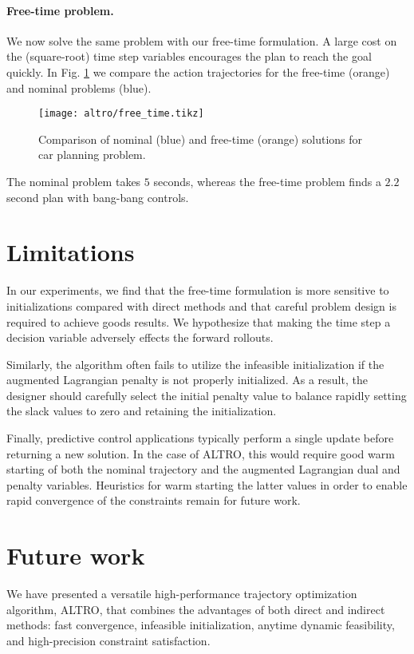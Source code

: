 \paragraph{Free-time problem.}
We now solve the same problem with our free-time formulation. A large cost on the (square-root) time step variables encourages the plan to reach the goal quickly. In Fig. \ref{altro_car_free_time} we compare the action trajectories for the free-time (orange) and nominal problems (blue). 
\begin{figure}[H]
	\begin{center}
		\texttt{[image: altro/free\_time.tikz]}
	\end{center}
	\caption[Comparison of action trajectories for fixed- and free-time problems for car planning problem]{Comparison of nominal (blue) and free-time (orange) solutions for car planning problem.}
	\label{altro_car_free_time}
\end{figure}
The nominal problem takes $5$ seconds, whereas the free-time problem finds a $2.2$ second plan with bang-bang controls.

\section{Limitations} \label{altro_limitations}
In our experiments, we find that the free-time formulation is more sensitive to initializations compared with direct methods and that careful problem design is required to achieve goods results. We hypothesize that making the time step a decision variable adversely effects the forward rollouts.

Similarly, the algorithm often fails to utilize the infeasible initialization if the augmented Lagrangian penalty is not properly initialized. As a result, the designer should carefully select the initial penalty value to balance rapidly setting the slack values to zero and retaining the initialization.

Finally, predictive control applications typically perform a single update before returning a new solution. In the case of ALTRO, this would require good warm starting of both the nominal trajectory and the augmented Lagrangian dual and penalty variables. Heuristics for warm starting the latter values in order to enable rapid convergence of the constraints remain for future work.

\section{Future work} \label{altro_future_work}
We have presented a versatile high-performance trajectory optimization algorithm, ALTRO, that combines the advantages of both direct and indirect methods: fast convergence, infeasible initialization, anytime dynamic feasibility, and high-precision constraint satisfaction.

